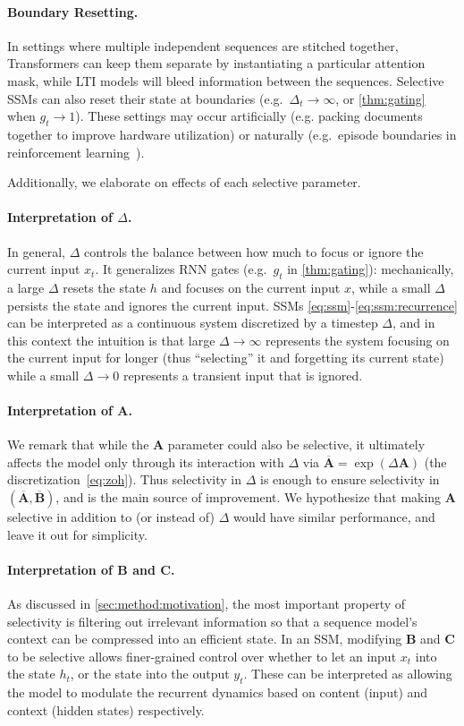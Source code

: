   \paragraph{Boundary Resetting.} In settings where multiple independent sequences are stitched together, Transformers can keep them separate by instantiating a particular attention mask, while LTI models will bleed information between the sequences. Selective SSMs can also reset their state at boundaries (e.g.\ $\Delta_t \to \infty$, or \ref{thm:gating} when $g_t \to 1$). These settings may occur artificially (e.g. packing documents together to improve hardware utilization) or naturally (e.g.\ episode boundaries in reinforcement learning~\citep{lu2023structured}).

Additionally, we elaborate on effects of each selective parameter.

\paragraph{Interpretation of $\Delta$.}
In general, $\Delta$ controls the balance between how much to focus or ignore the current input $x_t$. It generalizes RNN gates (e.g.\ $g_t$ in \ref{thm:gating}):
mechanically, a large $\Delta$ resets the state $h$ and focuses on the current input $x$, while a small $\Delta$ persists the state and ignores the current input. SSMs \eqref{eq:ssm}-\eqref{eq:ssm:recurrence} can be interpreted as a continuous system discretized by a timestep $\Delta$,
and in this context the intuition is that large $\Delta \to \infty$ represents the system focusing on the current input for longer (thus ``selecting'' it and forgetting its current state) while a small $\Delta \to 0$ represents a transient input that is ignored.

\paragraph{Interpretation of $\bm{A}$.}
We remark that while the $\bm{A}$ parameter could also be selective, it ultimately affects the model only through its interaction with $\Delta$ via $\overline{\bm{A}} = \exp(\Delta \bm{A})$ (the discretization~\eqref{eq:zoh}).
Thus selectivity in $\Delta$ is enough to ensure selectivity in $(\overline{\bm{A}}, \overline{\bm{B}})$, and is the main source of improvement. We hypothesize that making $\bm{A}$ selective in addition to (or instead of) $\Delta$ would have similar performance, and leave it out for simplicity.

\paragraph{Interpretation of $\bm{B}$ and $\bm{C}$.}
As discussed in \ref{sec:method:motivation}, the most important property of selectivity is filtering out irrelevant information so that a sequence model's context can be compressed into an efficient state. In an SSM, modifying $\bm{B}$ and $\bm{C}$ to be selective allows finer-grained control over whether to let an input $x_t$ into the state $h_t$, or the state into the output $y_t$. These can be interpreted as allowing the model to modulate the recurrent dynamics based on content (input) and context (hidden states) respectively.

